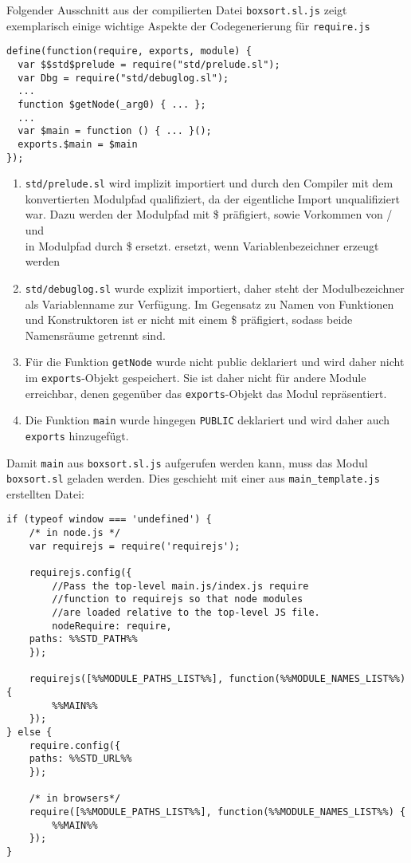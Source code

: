 \documentclass[runningheads]{llncs}
\begin{document}
Folgender Ausschnitt aus der compilierten Datei \texttt{boxsort.sl.js}
zeigt exemplarisch einige wichtige Aspekte der Codegenerierung für
\texttt{require.js}

\begin{verbatim}
define(function(require, exports, module) {
  var $$std$prelude = require("std/prelude.sl");
  var Dbg = require("std/debuglog.sl");
  ...
  function $getNode(_arg0) { ... };
  ...
  var $main = function () { ... }();
  exports.$main = $main
});
\end{verbatim}

\begin{enumerate}
\item \texttt{std/prelude.sl} wird implizit importiert und durch den
    Compiler mit dem konvertierten Modulpfad qualifiziert, da der
    eigentliche Import unqualifiziert war. Dazu werden der Modulpfad
    mit \$ präfigiert, sowie Vorkommen von / und \\ in Modulpfad
    durch \$ ersetzt.
ersetzt, wenn Variablenbezeichner erzeugt werden
\item \texttt{std/debuglog.sl} wurde explizit importiert, daher steht
    der Modulbezeichner als Variablenname zur Verfügung. Im Gegensatz
    zu Namen von Funktionen und Konstruktoren ist er nicht mit einem
    \$ präfigiert, sodass beide Namensräume getrennt sind.
\item Für die Funktion \texttt{getNode} wurde nicht public deklariert
    und wird daher nicht im \texttt{exports}-Objekt gespeichert. Sie
    ist daher nicht für andere Module erreichbar, denen gegenüber das
    \texttt{exports}-Objekt das Modul repräsentiert.
\item Die Funktion \texttt{main} wurde hingegen \texttt{PUBLIC}
    deklariert und wird daher auch \texttt{exports} hinzugefügt.
\end{enumerate}

Damit \texttt{main} aus \texttt{boxsort.sl.js} aufgerufen werden kann,
muss das Modul \texttt{boxsort.sl} geladen werden. Dies geschieht mit
einer aus \texttt{main\_template.js} erstellten Datei:

\begin{verbatim}
if (typeof window === 'undefined') {
    /* in node.js */
    var requirejs = require('requirejs');
    
    requirejs.config({
        //Pass the top-level main.js/index.js require
        //function to requirejs so that node modules
        //are loaded relative to the top-level JS file.
        nodeRequire: require,
	paths: %%STD_PATH%%
    });
    
    requirejs([%%MODULE_PATHS_LIST%%], function(%%MODULE_NAMES_LIST%%) {
        %%MAIN%%
    });
} else {
    require.config({
	paths: %%STD_URL%%
    });

    /* in browsers*/ 
    require([%%MODULE_PATHS_LIST%%], function(%%MODULE_NAMES_LIST%%) {
        %%MAIN%%
    });
}
\end{verbatim}
\end{document}
